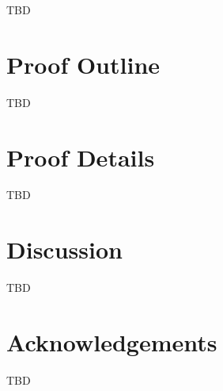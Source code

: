 \documentclass[11pt]{article}
\theoremstyle{definition}
\theoremstyle{plain}
\begin{document}
TBD

\section{Proof Outline}

TBD

\section{Proof Details}

TBD

\section{Discussion}

TBD

\section*{Acknowledgements}

TBD



\end{document}
